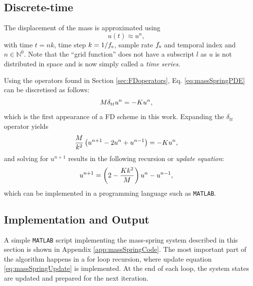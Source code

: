 \subsection{Discrete-time}
The displacement of the mass is approximated using 
\begin{equation}
    u(t) \approx u^n,
\end{equation}
with time $t = nk$, time step $k = 1/f_\text{s}$, sample rate $f_\text{s}$ and temporal index and $n \in \mathbb{N}^0$. Note that the ``grid function'' does not have a subscript $l$ as $u$ is not distributed in space and is now simply called a \textit{time series}.

Using the operators found in Section 
\ref{sec:FDoperators}, Eq. \eqref{eq:massSpringPDE} can be discretised as follows:
\begin{equation}\label{eq:massSpringFDS}
    M \delta_{tt} u^n = -Ku^n,
\end{equation}
which is the first appearance of a FD scheme in this work. Expanding the $\delta_{tt}$ operator yields 
\begin{equation*}
    \frac{M}{k^2}\left(u^{n+1}-2u^n+u^{n-1}\right) = -Ku^n,\nonumber
\end{equation*}
and solving for $u^{n+1}$ results in the following recursion or \textit{update equation}:
\begin{equation}\label{eq:massSpringUpdate}
    u^{n+1} = \left(2-\frac{Kk^2}{M} \right)u^n - u^{n-1},
\end{equation}
which can be implemented in a programming language such as \texttt{MATLAB}. 

\subsection{Implementation and Output}
A simple \texttt{MATLAB} script implementing the mass-spring system described in this section is shown in Appendix \ref{app:massSpringCode}. The most important part of the algorithm happens in a for loop recursion, where update equation \eqref{eq:massSpringUpdate} is implemented. At the end of each loop, the system states are updated and prepared for the next iteration. %

